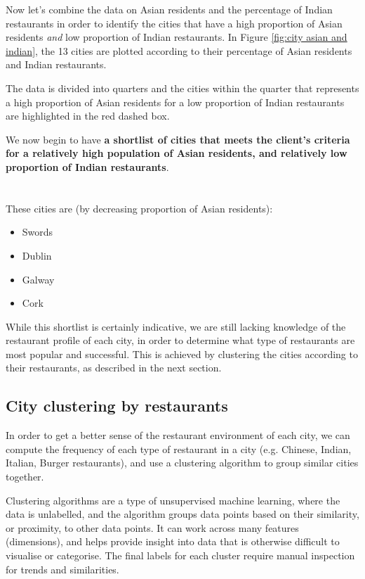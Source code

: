 \documentclass[a4paper,11pt]{article}
\begin{document}
Now let's combine the data on Asian residents and the percentage of Indian restaurants in order to identify the cities that have a high proportion of Asian residents \emph{and} low proportion of Indian restaurants. In Figure \ref{fig:city asian and indian}, the 13 cities are plotted according to their percentage of Asian residents and Indian restaurants. 

The data is divided into quarters and the cities within the quarter that represents a high proportion of Asian residents for a low proportion of Indian restaurants are highlighted in the red dashed box. 

We now begin to have \textbf{a shortlist of cities that meets the client's criteria for a relatively high population of Asian residents, and relatively low proportion of Indian restaurants}. 
\\
\\
\\
These cities are (by decreasing proportion of Asian residents):
%
\begin{itemize}
	\item Swords	
	\item Dublin
	\item Galway
	\item Cork
\end{itemize}
%
While this shortlist is certainly indicative, we are still lacking knowledge of the restaurant profile of each city, in order to determine what type of restaurants are most popular and successful. This is achieved by clustering the cities according to their restaurants, as described in the next section.

\subsection{City clustering by restaurants}\label{sec: clustering}
In order to get a better sense of the restaurant environment of each city, we can compute the frequency of each type of restaurant in a city (e.g. Chinese, Indian, Italian, Burger restaurants), and use a clustering algorithm to group similar cities together. 

Clustering algorithms are a type of unsupervised machine learning, where the data is unlabelled, and the algorithm groups data points based on their similarity, or proximity, to other data points. It can work across many features (dimensions), and helps provide insight into data that is otherwise difficult to visualise or categorise. The final labels for each cluster require manual inspection for trends and similarities.
\end{document}
